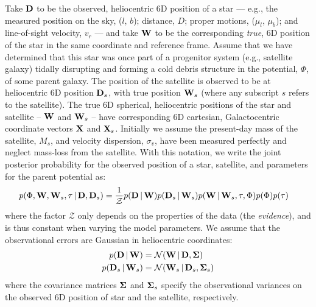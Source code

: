 \documentclass[letterpaper,12pt,preprint]{aastex}
\newcommand{\given}{\,|\,}
\newcommand{\D}{{\bf D}}
\newcommand{\W}{{\bf W}}
\newcommand{\X}{{\bf X}}
\newcommand{\bSigma}{{\bf \Sigma}}
\begin{document}
Take $\D$ to be the observed, heliocentric 6D position of a star --- e.g., the measured position on the sky, ($l$, $b$); distance, $D$; proper motions, ($\mu_l$, $\mu_b$); and line-of-sight velocity, $v_r$ --- and take $\W$ to be the corresponding \emph{true}, 6D position of the star in the same coordinate and reference frame. Assume that we have determined that this star was once part of a progenitor system (e.g., satellite galaxy) tidally disrupting and forming a cold debris structure in the potential, $\Phi$, of some parent galaxy. The position of the satellite is observed to be at heliocentric 6D position $\D_s$, with true position $\W_s$ (where any subscript $s$ refers to the satellite). The true 6D spherical, heliocentric positions of the star and satellite -- $\W$ and $\W_s$ -- have corresponding 6D cartesian, Galactocentric coordinate vectors $\X$ and $\X_s$. Initially we assume the present-day mass of the satellite, $M_s$, and velocity dispersion, $\sigma_v$, have been measured perfectly and neglect mass-loss from the satellite. With this notation, we write the joint posterior probability for the observed position of a star, satellite, and parameters for the parent potential as:
\begin{align}
	p(\Phi, \W, \W_s, \tau \given \D, \D_s) &= \frac{1}{\mathcal{Z}} p(\D \given \W) p(\D_s \given \W_s) 
												       p(\W \given \W_s, \tau, \Phi) 
												       p(\Phi) p(\tau)
\end{align}
where the factor $\mathcal{Z}$ only depends on the properties of the data (the \emph{evidence}), and is thus constant when varying the model parameters. We assume that the observational errors are Gaussian in heliocentric coordinates:
\begin{align}
	p(\D \given \W) &= \mathcal{N}(\W \given \D, \bSigma)\\
	p(\D_s \given \W_s) &= \mathcal{N}(\W_s \given \D_s, \bSigma_s)
\end{align}
where the covariance matrices $\bSigma$ and $\bSigma_s$ specify the observational variances on the observed 6D position of star and the satellite, respectively. 
\end{document}
